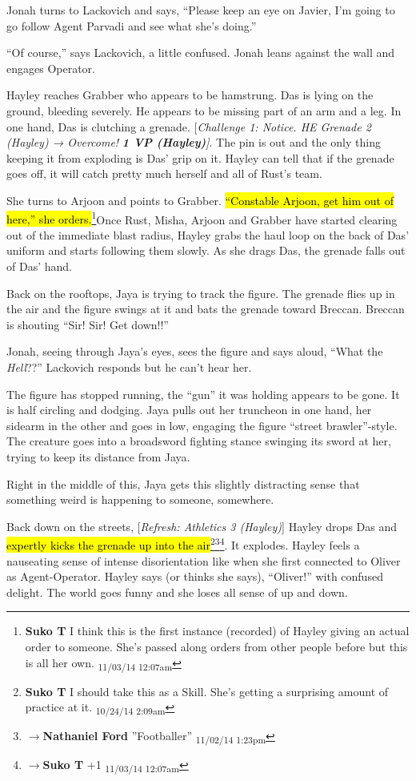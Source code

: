 Jonah turns to Lackovich and says, ``Please keep an eye on Javier, I'm going to go follow Agent Parvadi and see what she's doing.''

``Of course,'' says Lackovich, a little confused.   Jonah leans against the wall and engages Operator.



Hayley reaches Grabber who appears to be hamstrung.  Das is lying on the ground, bleeding severely.  He appears to be missing part of an arm and a leg.  In one hand, Das is clutching a grenade.  {[}\textit{Challenge 1: Notice.  HE Grenade 2 (Hayley) → Overcome! }\textit{\textbf{1 VP (Hayley)}}\textit{{]}}.  The pin is out and the only thing keeping it from exploding is Das' grip on it.  Hayley can tell that if the grenade goes off, it will catch pretty much herself and all of Rust's team.

She turns to Arjoon and points to Grabber.  \hl{``Constable Arjoon, get him out of here,'' she orders.}\footnote{\textbf{Suko T }I think this is the first instance (recorded) of Hayley giving an actual order to someone.  She's passed along orders from other people before but this is all her own. \textsubscript{11/03/14 12:07am}}Once Rust, Misha, Arjoon and Grabber have started clearing out of the immediate blast radius, Hayley grabs the haul loop on the back of Das' uniform and starts following them slowly.  As she drags Das, the grenade falls out of Das' hand. 



Back on the rooftops, Jaya is trying to track the figure.  The grenade flies up in the air and the figure swings at it and bats the grenade toward Breccan.  Breccan is shouting ``Sir!  Sir!  Get down!!''

Jonah, seeing through Jaya's eyes, sees the figure and says aloud, ``What the \textit{Hell}??''  Lackovich responds but he can't hear her.

The figure has stopped running, the ``gun'' it was holding appears to be gone.  It is half circling and dodging.  Jaya pulls out her truncheon in one hand, her sidearm in the other and goes in low, engaging the figure ``street brawler''-style.  The creature goes into a broadsword fighting stance swinging its sword at her, trying to keep its distance from Jaya.

Right in the middle of this, Jaya gets this slightly distracting sense that something weird is happening to someone, somewhere.



Back down on the streets, {[}\textit{Refresh: Athletics 3 (Hayley)}{]} Hayley drops Das and \hl{expertly kicks the grenade up into the air}\footnote{\textbf{Suko T }I should take this as a Skill.  She's getting a surprising amount of practice at it. \textsubscript{10/24/14 2:09am}}\footnote{$\rightarrow$\textbf{Nathaniel Ford }''Footballer'' \textsubscript{11/02/14 1:23pm}}\footnote{$\rightarrow$\textbf{Suko T }+1 \textsubscript{11/03/14 12:07am}}.  It explodes.  Hayley feels a nauseating sense of intense disorientation like when she first connected to Oliver as Agent-Operator.  Hayley says (or thinks she says), ``Oliver!'' with confused delight.  The world goes funny and she loses all sense of up and down.  


